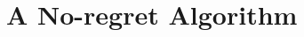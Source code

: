 \documentclass[final, 12pt]{colt2018} %
\begin{document}


\section{A No-regret Algorithm} 
\label{sec: alg-regret}


 
% 






\begin{appendix}

\end{appendix}
\end{document}
